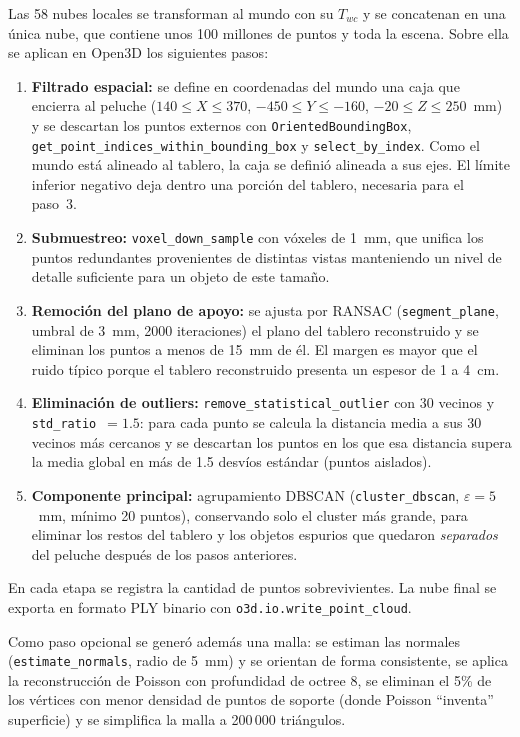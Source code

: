 \documentclass[conference]{IEEEtran}
\begin{document}
Las 58 nubes locales se transforman al mundo con su $T_{wc}$ y se concatenan
en una única nube, que contiene unos 100 millones de puntos y toda la escena.
Sobre ella se aplican en Open3D los siguientes pasos:
\begin{enumerate}
  \item \textbf{Filtrado espacial:} se define en coordenadas del mundo una
        caja que encierra al peluche
        ($140\le X\le370$, $-450\le Y\le-160$, $-20\le Z\le250$~mm) y se
        descartan los puntos externos con \texttt{OrientedBoundingBox},
        \texttt{get\_point\_indices\_}\allowbreak\texttt{within\_bounding\_box}
        y \texttt{select\_by\_index}. Como el mundo está alineado al tablero,
        la caja se definió alineada a sus ejes. El límite inferior negativo
        deja dentro una porción del tablero, necesaria para el paso~3.
  \item \textbf{Submuestreo:} \texttt{voxel\_down\_sample} con vóxeles de
        1~mm, que unifica los puntos redundantes provenientes de distintas
        vistas manteniendo un nivel de detalle suficiente para un objeto de
        este tamaño.
  \item \textbf{Remoción del plano de apoyo:} se ajusta por RANSAC
        (\texttt{segment\_plane}, umbral de 3~mm, 2000 iteraciones) el plano
        del tablero reconstruido y se eliminan los puntos a menos de 15~mm de
        él. El margen es mayor que el ruido típico porque el tablero
        reconstruido presenta un espesor de 1 a 4~cm.
  \item \textbf{Eliminación de outliers:}
        \texttt{remove\_statistical\_}\allowbreak\texttt{outlier} con 30
        vecinos y \texttt{std\_ratio}~$=1.5$: para cada punto se calcula la
        distancia media a sus 30 vecinos más cercanos y se descartan los
        puntos en los que esa distancia supera la media global en más de
        1.5 desvíos estándar (puntos aislados).
  \item \textbf{Componente principal:} agrupamiento DBSCAN
        (\texttt{cluster\_dbscan}, $\varepsilon=5$~mm, mínimo 20 puntos),
        conservando solo el cluster más grande, para eliminar los restos del
        tablero y los objetos espurios que quedaron \emph{separados} del
        peluche después de los pasos anteriores.
\end{enumerate}
En cada etapa se registra la cantidad de puntos sobrevivientes. La nube final
se exporta en formato PLY binario con
\texttt{o3d.io.write\_point\_cloud}.

Como paso opcional se generó además una malla: se estiman las normales
(\texttt{estimate\_normals}, radio de 5~mm) y se orientan de forma
consistente, se aplica la reconstrucción de Poisson con profundidad de octree
8, se eliminan el 5\% de los vértices con menor densidad de puntos de soporte
(donde Poisson ``inventa'' superficie) y se simplifica la malla a 200\,000
triángulos.
\end{document}
